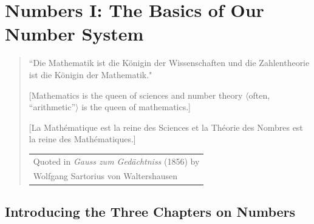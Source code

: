 
\chapter{Numbers I:
The Basics of Our Number System}
\label{ch:numbers-numerals}

\begin{quote}
``Die Mathematik ist die K\"{o}nigin der Wissenschaften und die Zahlentheorie ist die K\"{o}nigin der Mathematik."

\smallskip

[Mathematics is the queen of sciences and number theory $\langle$often, ``arithmetic''$\rangle$ is the queen of mathematics.]
  
[La Math\'ematique est la reine des Sciences et la Th\'eorie des Nombres est la reine des Math\'ematiques.]

\hfill
\begin{tabular}{l}
Quoted in {\it Gauss zum Gedächtniss} (1856) by \\
Wolfgang Sartorius von Waltershausen 
\end{tabular}
\end{quote}


\section{Introducing the Three Chapters on Numbers}

